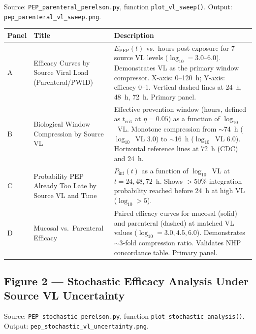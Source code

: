 \documentclass[11pt]{article}
\theoremstyle{definition}
\theoremstyle{remark}
\newcommand{\Pint}{P_{\text{int}}}
\newcommand{\Epep}{E_{\text{PEP}}}
\newcommand{\tcrit}{t_{\text{crit}}}
\begin{document}
Source: \texttt{PEP\_parenteral\_perelson.py}, function \texttt{plot\_vl\_sweep()}. Output: \texttt{pep\_parenteral\_vl\_sweep.png}.

\begin{table}[H]
\centering
\small
\begin{tabular}{@{}lp{4cm}p{8cm}@{}}
\toprule
\textbf{Panel} & \textbf{Title} & \textbf{Description} \\
\midrule
A & Efficacy Curves by Source Viral Load (Parenteral/PWID) & $\Epep(t)$ vs.\ hours post-exposure for 7 source VL levels ($\log_{10} = 3.0$--$6.0$). Demonstrates VL as the primary window compressor. X-axis: 0--120~h; Y-axis: efficacy 0--1. Vertical dashed lines at 24~h, 48~h, 72~h. Primary panel. \\
B & Biological Window Compression by Source VL & Effective prevention window (hours, defined as $\tcrit$ at $\eta = 0.05$) as a function of $\log_{10}$~VL. Monotone compression from $\sim$74~h ($\log_{10}$~VL 3.0) to $\sim$16~h ($\log_{10}$~VL 6.0). Horizontal reference lines at 72~h (CDC) and 24~h. \\
C & Probability PEP Already Too Late by Source VL and Time & $\Pint(t)$ as a function of $\log_{10}$~VL at $t = 24, 48, 72$~h. Shows $>$50\% integration probability reached before 24~h at high VL ($\log_{10} > 5$). \\
D & Mucosal vs.\ Parenteral Efficacy & Paired efficacy curves for mucosal (solid) and parenteral (dashed) at matched VL values ($\log_{10} = 3.0, 4.5, 6.0$). Demonstrates $\sim$3-fold compression ratio. Validates NHP concordance table. Primary panel. \\
\bottomrule
\end{tabular}
\end{table}

\subsection{Figure 2 --- Stochastic Efficacy Analysis Under Source VL Uncertainty}

Source: \texttt{PEP\_stochastic\_perelson.py}, function \texttt{plot\_stochastic\_analysis()}. Output: \texttt{pep\_stochastic\_vl\_uncertainty.png}.
\end{document}
